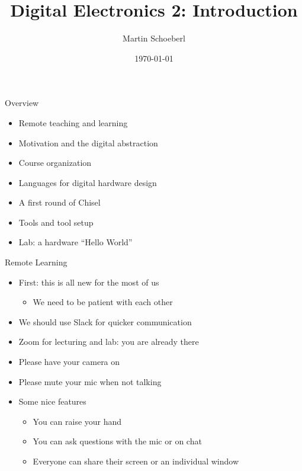 

\newif\ifbook


\title{Digital Electronics 2: Introduction}
\author{Martin Schoeberl}
\date{\today}



\begin{frame}
\titlepage
\end{frame}


\begin{frame}[fragile]{Overview}
\begin{itemize}
\item Remote teaching and learning
\item Motivation and the digital abstraction
\item Course organization
\item Languages for digital hardware design
\item A first round of Chisel
\item Tools and tool setup
\item Lab: a hardware ``Hello World''
\end{itemize}
\end{frame}

\begin{frame}[fragile]{Remote Learning}
\begin{itemize}
\item First: this is all new for the most of us
\begin{itemize}
\item We need to be patient with each other
\end{itemize}
\item We should use Slack for quicker communication
\item Zoom for lecturing and lab: you are already there
\item Please have your camera on
\item Please mute your mic when not talking
\item Some nice features
\begin{itemize}
\item You can raise your hand
\item You can ask questions with the mic or on chat
\item Everyone can share their screen or an individual window
\end{itemize}
\end{itemize}
\end{frame}

